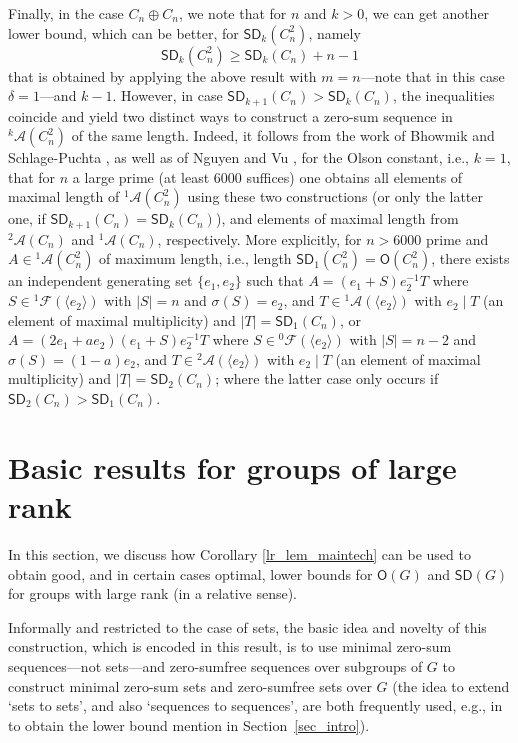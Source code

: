 \documentclass{amsart}
\theoremstyle{definition}
\numberwithin{equation}{section}
\begin{document}
Finally, in the case $C_n \oplus C_n$, we note that for $n$ and $k>0$, we can get another lower bound, which can be better, for
${\mathsf{SD}}_{k}(C_n^2)$, namely
\[
{\mathsf{SD}}_{k}(C_n^2)\ge {\mathsf{SD}}_{k}(C_n)+n-1
\]
that is obtained by applying the above result with $m=n$---note that in this case $\delta=1$---and $k-1$.
However, in case ${\mathsf{SD}}_{k+1}(C_n)> {\mathsf{SD}}_k(C_n)$, the inequalities coincide and yield
two distinct ways to construct a zero-sum sequence in ${{}^{{k}}\!\mathcal{A}}(C_n^2)$ of the same length.
Indeed, it follows from the work of Bhowmik and Schlage-Puchta \cite{bhowmik}, as well as of Nguyen and Vu \cite{nguvu2}, for the Olson constant, i.e., $k=1$, that for $n$ a large prime (at least $6000$ suffices) one obtains all elements of maximal length of ${{}^{{1}}\!\mathcal{A}}(C_n^2)$ using these two constructions (or only the latter one, if ${\mathsf{SD}}_{k+1}(C_n) = {\mathsf{SD}}_k(C_n)$), and elements of maximal length
from ${{}^{{2}}\!\mathcal{A}}(C_n)$ and ${{}^{{1}}\!\mathcal{A}}(C_n)$, respectively.
More explicitly, for $n>6000$ prime and $A \in {{}^{{1}}\!\mathcal{A}}(C_n^2)$ of maximum length, i.e., length ${\mathsf{SD}}_1(C_n^2) = {\mathsf{O}}(C_n^2)$, 
there exists an independent
generating set $\{ e_1, e_2\}$
such that $A= (e_1 + S)e_2^{-1}T$ where $S \in {{}^{{1}}\!\mathcal{F}}( \langle e_2 \rangle )$
with $|S|=n$ and $\sigma(S)=e_2$, and
$T\in {{}^{{1}}\!\mathcal{A}}(\langle e_2 \rangle)$ with $e_2\mid T$ (an element of maximal multiplicity) and $|T|={\mathsf{SD}}_1(C_n)$,
or $A=(2e_1+ae_2)(e_1+S)e_2^{-1}T$ where
$S \in {{}^{{0}}\!\mathcal{F}}( \langle e_2 \rangle)$
with $|S|=n-2$ and $\sigma(S)=(1-a)e_2$, and
$T\in {{}^{{2}}\!\mathcal{A}}(\langle e_2 \rangle)$ with $e_2\mid T$ (an element of maximal multiplicity) and $|T|={\mathsf{SD}}_2(C_n)$;
where the latter case only occurs if ${\mathsf{SD}}_2(C_n)> {\mathsf{SD}}_1(C_n)$.

\section{Basic results for groups of large rank}
\label{sec_basic}

In this section, we discuss how Corollary \ref{lr_lem_maintech} can
be used to obtain good, and in certain cases optimal, lower bounds
for ${\mathsf{O}}(G)$ and ${\mathsf{SD}}(G)$ for groups with large rank (in a relative sense).

Informally and restricted to the case of sets, the basic idea and novelty of this construction, which is encoded in this result, is
to use minimal zero-sum sequences---not sets---and zero-sumfree sequences over subgroups of $G$ to construct
minimal zero-sum sets and zero-sumfree sets over $G$ (the idea to extend `sets to sets', and also `sequences to sequences', are both frequently used, e.g., in \cite{ruzsa} to obtain the lower bound mention in Section~\ref{sec_intro}).
\end{document}
